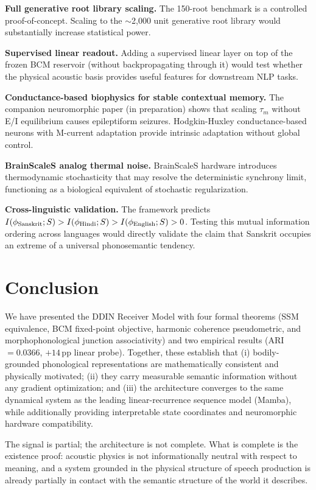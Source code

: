 \documentclass{article}
\begin{document}
\textbf{Full generative root library scaling.} The 150-root benchmark is a controlled proof-of-concept. Scaling to the $\sim$2,000 unit generative root library would substantially increase statistical power.

\textbf{Supervised linear readout.} Adding a supervised linear layer on top of the frozen BCM reservoir (without backpropagating through it) would test whether the physical acoustic basis provides useful features for downstream NLP tasks.

\textbf{Conductance-based biophysics for stable contextual memory.} The companion neuromorphic paper (in preparation) shows that scaling $\tau_m$ without E/I equilibrium causes epileptiform seizures. Hodgkin-Huxley conductance-based neurons with M-current adaptation provide intrinsic adaptation without global control.

\textbf{BrainScaleS analog thermal noise.} BrainScaleS hardware introduces thermodynamic stochasticity that may resolve the deterministic synchrony limit, functioning as a biological equivalent of stochastic regularization.

\textbf{Cross-linguistic validation.} The framework predicts $I(\phi_{\rm Sanskrit}; S) > I(\phi_{\rm Hindi}; S) > I(\phi_{\rm English}; S) > 0$. Testing this mutual information ordering across languages would directly validate the claim that Sanskrit occupies an extreme of a universal phonosemantic tendency.

\section{Conclusion}

We have presented the DDIN Receiver Model with four formal theorems (SSM equivalence, BCM fixed-point objective, harmonic coherence pseudometric, and morphophonological junction associativity) and two empirical results (ARI\,$=0.0366$, $+14$\,pp linear probe). Together, these establish that (i) bodily-grounded phonological representations are mathematically consistent and physically motivated; (ii) they carry measurable semantic information without any gradient optimization; and (iii) the architecture converges to the same dynamical system as the leading linear-recurrence sequence model (Mamba), while additionally providing interpretable state coordinates and neuromorphic hardware compatibility.

The signal is partial; the architecture is not complete. What is complete is the existence proof: acoustic physics is not informationally neutral with respect to meaning, and a system grounded in the physical structure of speech production is already partially in contact with the semantic structure of the world it describes.
\end{document}
